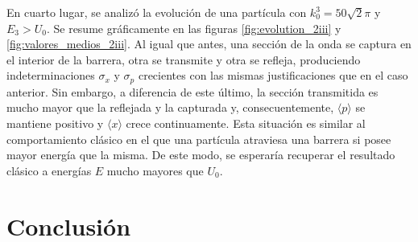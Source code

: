 \documentclass[aps,prb,twocolumn,superscriptaddress,floatfix,longbibliography]{revtex4-2}
\begin{document}
En cuarto lugar, se analizó la evolución de una partícula con $k_0^3 = 50 \sqrt{2} \pi$ y $E_3 > U_0$. Se resume gráficamente en las figuras \ref{fig:evolution_2iii} y \ref{fig:valores_medios_2iii}. Al igual que antes, una sección de la onda se captura en el interior de la barrera, otra se transmite y otra se refleja, produciendo indeterminaciones $\sigma_x$ y $\sigma_p$ crecientes con las mismas justificaciones que en el caso anterior. Sin embargo, a diferencia de este último, la sección transmitida es mucho mayor que la reflejada y la capturada y, consecuentemente, $\langle p \rangle$ se mantiene positivo y $\langle x \rangle$ crece continuamente. Esta situación es similar al comportamiento clásico en el que una partícula atraviesa una barrera si posee mayor energía que la misma. De este modo, se esperaría recuperar el resultado clásico a energías $E$ mucho mayores que $U_0$.


\section{Conclusión}
\end{document}

